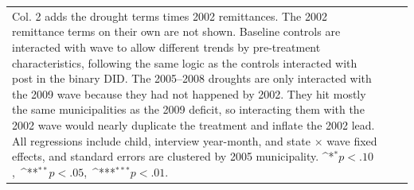 \documentclass[12pt]{article}
\def\sym#1{\ifmmode^{#1}\else\(^{#1}\)\fi}
\begin{document}
\begin{longtable}{l*{2}{c}}
{Col. 2 adds the drought terms times 2002 remittances. The 2002 remittance terms on their own are not shown.
Baseline controls are interacted with wave to allow different trends by pre-treatment characteristics, following the same logic as the controls interacted with post in the binary DID. The 2005--2008 droughts are only interacted with the 2009 wave because they had not happened by 2002. They hit mostly the same municipalities as the 2009 deficit, so interacting them with the 2002 wave would nearly duplicate the treatment and inflate the 2002 lead. All regressions include child, interview year-month, and state \ensuremath{\times} wave fixed effects, and standard errors are clustered by 2005 municipality. \mbox{\sym{*}\(p<.10\), \sym{**}\(p<.05\), \sym{***}\(p<.01\).}}\\
\end{longtable}
\endgroup
\clearpage
\begingroup
\footnotesize
\renewcommand{\arraystretch}{0.86}
\setlength{\tabcolsep}{4pt}
\setlength{\LTcapwidth}{\textwidth}
\end{document}
